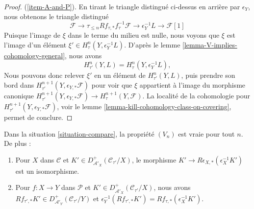 \begin{proof}
(\ref{item-A-and-P}). En tirant le triangle distingué ci-dessus en arrière
par $\epsilon_Y$, nous obtenons le triangle distingué
$$
\mathcal{F} \to \tau_{\leq n}Rf_{\tau, *}f_\tau^{-1}\mathcal{F}
\to \epsilon_Y^{-1}L \to \mathcal{F}[1]
$$
Puisque l'image de $\xi$ dans le terme du milieu est nulle, nous voyons que
$\xi$ est l'image d'un élément
$\xi' \in H^n_\tau(Y, \epsilon_Y^{-1}L)$.
D'après le lemme \ref{lemma-V-implies-cohomology-general}, nous avons
$$
H^n_{\tau'}(Y, L) = H^n_\tau(Y, \epsilon_Y^{-1}L),
$$
Nous pouvons donc relever $\xi'$ en un élément de $H^n_{\tau'}(Y, L)$,
puis prendre son bord dans
$H^{n + 1}_{\tau'}(Y, \epsilon_{Y, *}\mathcal{F})$
pour voir que $\xi$ appartient à l'image du morphisme canonique
$H^{n + 1}_{\tau'}(Y, \epsilon_{Y, *}\mathcal{F}) \to
H^{n + 1}_\tau(Y, \mathcal{F})$.
La localité de la cohomologie pour
$H^{n + 1}_{\tau'}(Y,\epsilon_{Y, *}\mathcal{F})$, voir le
lemme \ref{lemma-kill-cohomology-class-on-covering}, permet de conclure.
\end{proof}

\begin{lemma}
\label{lemma-V-C-all-n-general}
Dans la situation \ref{situation-compare}, la propriété $(V_n)$ est vraie
pour tout $n$. De plus :
\begin{enumerate}
\item Pour $X$ dans $\mathcal{C}$ et
$K' \in D^+_{\mathcal{A}'_X}(\mathcal{C}_{\tau'}/X)$, le morphisme
$K' \to R\epsilon_{X, *}(\epsilon_X^{-1}K')$ est un isomorphisme.
\item Pour $f : X \to Y$ dans $\mathcal{P}$ et
$K' \in D^+_{\mathcal{A}'_X}(\mathcal{C}_{\tau'}/X)$, nous avons
$Rf_{\tau', *}K' \in D^+_{\mathcal{A}'_Y}(\mathcal{C}_{\tau'}/Y)$ et
$\epsilon_Y^{-1}(Rf_{\tau', *}K') = Rf_{\tau, *}(\epsilon_X^{-1}K')$.
\end{enumerate}
\end{lemma}

